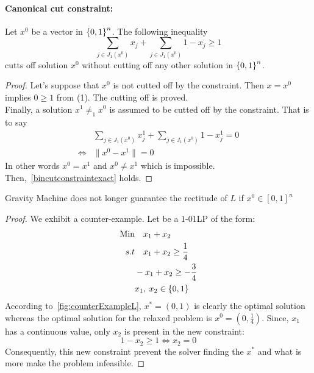 \paragraph*{Canonical cut constraint:}
\begin{proposition}\label{bincutconstraintexact}
    Let $x^0$ be a vector in $\left\lbrace 0,1 \right\rbrace^n$. The following inequality
    \begin{equation}
        \sum_{j\in J_1(x^0)} x_j + \sum_{j \in J_1(x^0)} 1-x_ j \geq 1
    \end{equation}
    cutts off solution $x^0$ without cutting off any other solution in $\left\lbrace 0,1 \right\rbrace^n$.
\end{proposition}
\begin{proof}
Let's suppose that $x^0$ is not cutted off by the constraint. Then $x = x^0$ implies $0\geq 1$ from (1). The cutting off is proved.
\\Finally, a solution $x^1 \neq_1 x^0$ is assumed to be cutted off by the constraint. That is to say
\begin{align}
    & \sum_{j\in J_1(x^0)} x_j^1 + \sum_{j \in J_1(x^0)} 1-x_ j^1 = 0 \\
    \Longleftrightarrow &   \| x^0 - x^1 \| = 0
\end{align}
In other words $x^0 = x^1$ and $x^0 \neq x^1$ which is impossible. Then,~\ref{bincutconstraintexact} holds.
\end{proof}
\begin{proposition}
    Gravity Machine does not longer guarantee the rectitude of $L$ if $x^0\in \left\lbrack 0,1 \right\rbrack ^n$
\end{proposition}
\begin{proof}
    We exhibit a counter-example. Let be a $1$-01LP of the form:
    \begin{align}
        \text{Min}  & \quad x_1 + x_2\\
        s.t & \quad x_1 + x_ 2 \geq \frac{1}{4}\\
        & -x_1 + x_2 \geq -\frac{3}{4}\\
        & x_1, \: x_2 \in \left\lbrace 0,1 \right\rbrace
    \end{align} 
    According to~\ref{fig:counterExampleL}, $x^* = \left(0,1\right)$ is clearly the optimal solution whereas 
    the optimal solution for the relaxed problem is $x^0 = \left( 0, \frac{1}{4}\right)$.
    Since, $x_1$ has a continuous value, only $x_2$ is present in the new constraint:
    \begin{equation}
        1-x_2 \geq 1 \Leftrightarrow x_2 = 0
    \end{equation}
    Consequently, this new constraint prevent the solver finding the $x^*$ and what is more make the problem infeasible.
\end{proof}
